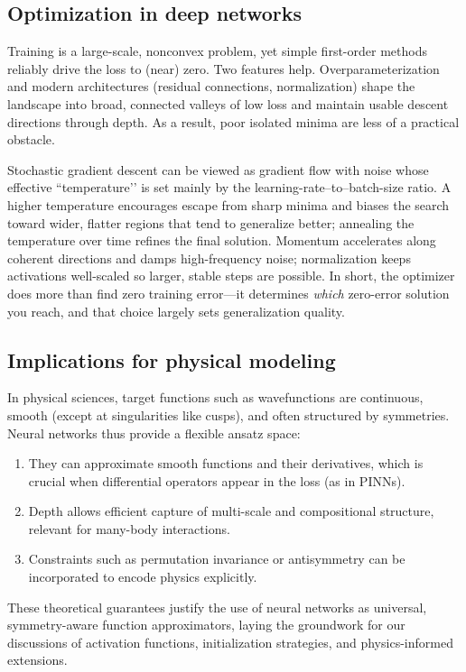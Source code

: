 \subsection{Optimization in deep networks}
\label{sec:optimization}

Training is a large-scale, nonconvex problem, yet simple first-order methods reliably drive the loss to (near) zero. Two features help. Overparameterization and modern architectures (residual connections, normalization) shape the landscape into broad, connected valleys of low loss and maintain usable descent directions through depth. As a result, poor isolated minima are less of a practical obstacle.

Stochastic gradient descent can be viewed as gradient flow with noise whose effective “temperature’’ is set mainly by the learning-rate–to–batch-size ratio. A higher temperature encourages escape from sharp minima and biases the search toward wider, flatter regions that tend to generalize better; annealing the temperature over time refines the final solution. Momentum accelerates along coherent directions and damps high-frequency noise; normalization keeps activations well-scaled so larger, stable steps are possible. In short, the optimizer does more than find zero training error—it determines \emph{which} zero-error solution you reach, and that choice largely sets generalization quality.

\subsection{Implications for physical modeling}
In physical sciences, target functions such as wavefunctions are continuous, smooth 
(except at singularities like cusps), and often structured by symmetries. 
Neural networks thus provide a flexible ansatz space:
\begin{enumerate}
  \item They can approximate smooth functions and their derivatives, which is crucial 
  when differential operators appear in the loss (as in PINNs).  
  \item Depth allows efficient capture of multi-scale and compositional structure, 
  relevant for many-body interactions.  
  \item Constraints such as permutation invariance or antisymmetry can be incorporated 
  to encode physics explicitly.  
\end{enumerate}

These theoretical guarantees justify the use of neural networks as universal, symmetry-aware 
function approximators, laying the groundwork for our discussions of activation functions, 
initialization strategies, and physics-informed extensions.  

